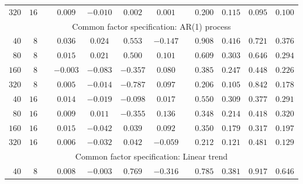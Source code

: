 \documentclass[12pt,fleqn]{article}
\begin{document}
\begin{table}[H]
\begin{tabular}{rrcccccccccc}
   {\small $320$} & {\small $16$} & {\small $$} & {\small $0.009$} & {\small $-0.010$} & {\small $0.002$} & {\small $0.001$} & {\small $$} & {\small $0.200$} & {\small $0.115$} & {\small $0.095$} & {\small $0.100$} \\
   \multicolumn{12}{c}{\small Common factor specification: AR(1) process}\\
   {\small $40$} & {\small $8$} & {\small $$} & {\small $0.036$} & {\small $0.024$} & {\small $0.553$} & {\small $-0.147$} & {\small $$} & {\small $0.908$} & {\small $0.416$} & {\small $0.721$} & {\small $0.376$} \\
   {\small $80$} & {\small $8$} & {\small $$} & {\small $0.015$} & {\small $0.021$} & {\small $0.500$} & {\small $0.101$} & {\small $$} & {\small $0.609$} & {\small $0.303$} & {\small $0.646$} & {\small $0.294$} \\
   {\small $160$} & {\small $8$} & {\small $$} & {\small $-0.003$} & {\small $-0.083$} & {\small $-0.357$} & {\small $0.080$} & {\small $$} & {\small $0.385$} & {\small $0.247$} & {\small $0.448$} & {\small $0.226$} \\
   {\small $320$} & {\small $8$} & {\small $$} & {\small $0.005$} & {\small $-0.014$} & {\small $-0.787$} & {\small $0.097$} & {\small $$} & {\small $0.206$} & {\small $0.105$} & {\small $0.842$} & {\small $0.178$} \\
   {\small $40$} & {\small $16$} & {\small $$} & {\small $0.014$} & {\small $-0.019$} & {\small $-0.098$} & {\small $0.017$} & {\small $$} & {\small $0.550$} & {\small $0.309$} & {\small $0.377$} & {\small $0.291$} \\
   {\small $80$} & {\small $16$} & {\small $$} & {\small $0.009$} & {\small $0.011$} & {\small $-0.355$} & {\small $0.136$} & {\small $$} & {\small $0.348$} & {\small $0.214$} & {\small $0.418$} & {\small $0.320$} \\
   {\small $160$} & {\small $16$} & {\small $$} & {\small $0.015$} & {\small $-0.042$} & {\small $0.039$} & {\small $0.092$} & {\small $$} & {\small $0.350$} & {\small $0.179$} & {\small $0.317$} & {\small $0.197$} \\
   {\small $320$} & {\small $16$} & {\small $$} & {\small $0.006$} & {\small $-0.032$} & {\small $0.042$} & {\small $-0.059$} & {\small $$} & {\small $0.212$} & {\small $0.121$} & {\small $0.481$} & {\small $0.129$} \\
   \multicolumn{12}{c}{\small Common factor specification: Linear trend}\\
   {\small $40$} & {\small $8$} & {\small $$} & {\small $0.008$} & {\small $-0.003$} & {\small $0.769$} & {\small $-0.316$} & {\small $$} & {\small $0.785$} & {\small $0.381$} & {\small $0.917$} & {\small $0.646$} \\

\end{tabular}
\end{table}
\end{document}

